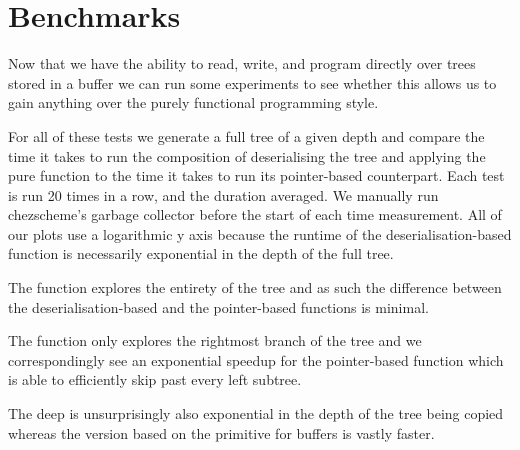 


\section{Benchmarks}\label{sec:timing}

Now that we have the ability to read, write, and program directly
over trees stored in a buffer we can run some experiments to see
whether this allows us to gain anything over the purely functional
programming style.

For all of these tests we generate a full tree of a given depth and
compare the time it takes to run the composition of deserialising
the tree and applying the pure function to the time it takes to run
its pointer-based counterpart.
%
Each test is run 20 times in a row, and the duration averaged.
%
We manually run chezscheme's garbage collector before the start of
each time measurement.
%
All of our plots use a logarithmic y axis because the runtime of the
deserialisation-based function is necessarily exponential in the depth
of the full tree.

The  function explores the entirety of the tree
and as such the difference between the deserialisation-based and the
pointer-based functions is minimal.

\noindent
\begin{minipage}{.45\textwidth}
\end{minipage}\hfill
\begin{minipage}{.45\textwidth}
\end{minipage}

The  function only explores the rightmost
branch of the tree and we correspondingly see an exponential speedup
for the pointer-based function which is able to efficiently skip past
every left subtree.

\noindent
\begin{minipage}{.45\textwidth}
\end{minipage}\hfill
\begin{minipage}{.45\textwidth}
\end{minipage}

The deep  is unsurprisingly also exponential in
the depth of the tree being copied whereas the version based on the
 primitive for buffers is vastly faster.

\begin{center}
\begin{minipage}{.45\textwidth}
\end{minipage}
\end{center}
